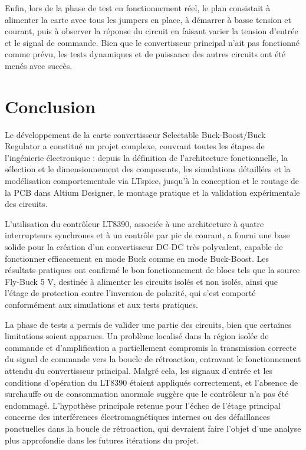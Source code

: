 Enfin, lors de la phase de test en fonctionnement réel, le plan consistait à alimenter la carte avec tous les jumpers en place, à démarrer à basse tension et courant, puis à observer la réponse du circuit en faisant varier la tension d'entrée et le signal de commande. Bien que le convertisseur principal n'ait pas fonctionné comme prévu, les tests dynamiques et de puissance des autres circuits ont été menés avec succès.


\section{Conclusion}

Le développement de la carte convertisseur Selectable Buck-Boost/Buck Regulator a constitué un projet complexe, couvrant toutes les étapes de l'ingénierie électronique : depuis la définition de l'architecture fonctionnelle, la sélection et le dimensionnement des composants, les simulations détaillées et la modélisation comportementale via LTspice, jusqu'à la conception et le routage de la PCB dans Altium Designer, le montage pratique et la validation expérimentale des circuits.

L'utilisation du contrôleur LT8390, associée à une architecture à quatre interrupteurs synchrones et à un contrôle par pic de courant, a fourni une base solide pour la création d'un convertisseur DC-DC très polyvalent, capable de fonctionner efficacement en mode Buck comme en mode Buck-Boost. Les résultats pratiques ont confirmé le bon fonctionnement de blocs tels que la source Fly-Buck 5 V, destinée à alimenter les circuits isolés et non isolés, ainsi que l'étage de protection contre l'inversion de polarité, qui s'est comporté conformément aux simulations et aux tests pratiques.

La phase de tests a permis de valider une partie des circuits, bien que certaines limitations soient apparues. Un problème localisé dans la région isolée de commande et d'amplification a partiellement compromis la transmission correcte du signal de commande vers la boucle de rétroaction, entravant le fonctionnement attendu du convertisseur principal. Malgré cela, les signaux d'entrée et les conditions d'opération du LT8390 étaient appliqués correctement, et l'absence de surchauffe ou de consommation anormale suggère que le contrôleur n'a pas été endommagé. L'hypothèse principale retenue pour l'échec de l'étage principal concerne des interférences électromagnétiques internes ou des défaillances ponctuelles dans la boucle de rétroaction, qui devraient faire l'objet d'une analyse plus approfondie dans les futures itérations du projet.

